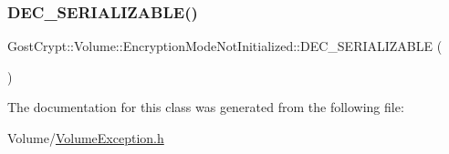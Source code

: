 \subsubsection{\texorpdfstring{D\+E\+C\+\_\+\+S\+E\+R\+I\+A\+L\+I\+Z\+A\+B\+L\+E()}{DEC\_SERIALIZABLE()}}
{\footnotesize\ttfamily Gost\+Crypt\+::\+Volume\+::\+Encryption\+Mode\+Not\+Initialized\+::\+D\+E\+C\+\_\+\+S\+E\+R\+I\+A\+L\+I\+Z\+A\+B\+LE (\begin{DoxyParamCaption}\item[{\hyperlink{class_gost_crypt_1_1_volume_1_1_encryption_mode_not_initialized}{Encryption\+Mode\+Not\+Initialized}}]{ }\end{DoxyParamCaption})}



The documentation for this class was generated from the following file\+:\begin{DoxyCompactItemize}
\item 
Volume/\hyperlink{_volume_exception_8h}{Volume\+Exception.\+h}\end{DoxyCompactItemize}
